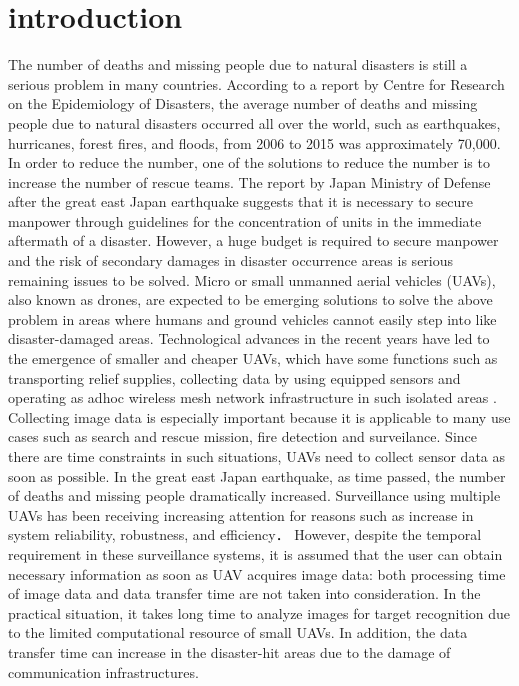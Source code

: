 \documentclass{ieeeaccess}
\begin{document}
\section{introduction}\label{intro}
The number of deaths and missing people due to natural disasters is still a serious problem in many countries.
According to a report by Centre for Research on the Epidemiology of Disasters\cite{CRED2016}, the average number of deaths and missing people due to natural disasters occurred all over the world, such as earthquakes, hurricanes, forest fires, and floods, from 2006 to 2015 was approximately 70,000.
In order to reduce the number, one of the solutions to reduce the number is to increase the number of rescue teams.
The report by Japan Ministry of Defense after the great east Japan earthquake suggests that  it is necessary to secure manpower through guidelines for the concentration of units in the immediate aftermath of a disaster.
%
However, a huge budget is required to secure manpower and the risk of secondary damages in disaster occurrence areas is serious remaining issues to be solved\cite{disaster2011}.
%
Micro or small unmanned aerial vehicles (UAVs), also known as
drones, are expected to be emerging solutions to solve the above problem in areas where humans and ground vehicles cannot easily step into like disaster-damaged areas.
Technological advances in the recent years have led to the emergence of smaller and cheaper UAVs, which have some functions such as transporting relief supplies, collecting data by using equipped sensors and operating as adhoc wireless mesh network infrastructure in such isolated areas \cite{Andre2014,Erdelj2016,Felice2014}.
Collecting image data is especially important because it is applicable to many use cases such as search and rescue mission, fire detection and surveilance.
%
Since  there are time constraints in such situations, UAVs need to collect sensor data as soon as possible.
In the great east Japan earthquake, as time passed, the number of deaths and missing people  dramatically increased\cite{japan2011}.
Surveillance using multiple UAVs has been receiving increasing attention for reasons such as increase in system reliability, robustness, and efficiency\cite{Lanillos2014,Maza2007,Meng2014,chang2016,Mirzaei2011}．
However, despite the temporal requirement in these surveillance systems, it is assumed that the user can obtain necessary information as soon as UAV acquires image data: both processing time of image data and data transfer time are not taken into consideration. In the practical situation, it takes long time to analyze images for target recognition due to the limited computational resource of small UAVs. In addition, the data transfer time can increase in the disaster-hit areas due to the damage of communication infrastructures.
\end{document}
